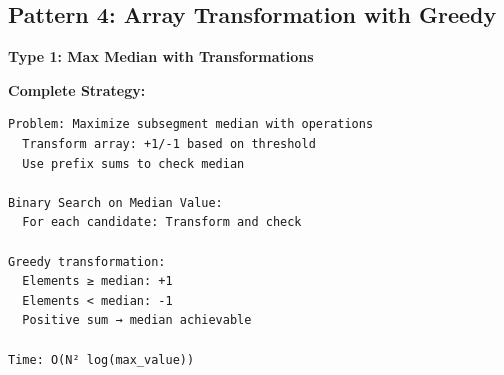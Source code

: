 \documentclass[11pt,a4paper,oneside]{book}
\begin{document}
\subsection{Pattern 4: Array Transformation with Greedy}

\begin{tcolorbox}[
    enhanced,breakable,
    colback=dangered!10,
    colframe=dangered,
    boxrule=2pt,
    arc=4mm,
    title=\textbf{Complete Transformation Algorithms}
]
\textbf{Type 1: Max Median with Transformations}

\textbf{Complete Strategy:}
\begin{verbatim}
Problem: Maximize subsegment median with operations
  Transform array: +1/-1 based on threshold
  Use prefix sums to check median
  
Binary Search on Median Value:
  For each candidate: Transform and check
  
Greedy transformation:
  Elements ≥ median: +1
  Elements < median: -1
  Positive sum → median achievable

Time: O(N² log(max_value))
\end{verbatim}
\end{tcolorbox}
\end{document}
